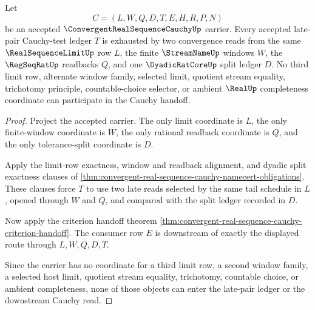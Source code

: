 \begin{theorem}\label{thm:convergent-real-sequence-cauchy-late-pair-exhaustion}
Let
$$
C=(L,W,Q,D,T,E,H,R,P,N)
$$
be an accepted $\ConvergentRealSequenceCauchyUp$ carrier. Every accepted late-pair Cauchy-test ledger $T$ is exhausted by two convergence reads from the same $\RealSequenceLimitUp$ row $L$, the finite $\StreamNameUp$ windows $W$, the $\RegSeqRatUp$ readbacks $Q$, and one $\DyadicRatCoreUp$ split ledger $D$. No third limit row, alternate window family, selected limit, quotient stream equality, trichotomy principle, countable-choice selector, or ambient $\RealUp$ completeness coordinate can participate in the Cauchy handoff.
\end{theorem}
\begin{proof}
Project the accepted carrier. The only limit coordinate is $L$, the only finite-window coordinate is $W$, the only rational readback coordinate is $Q$, and the only tolerance-split coordinate is $D$.

Apply the limit-row exactness, window and readback alignment, and dyadic split exactness clauses of \autoref{thm:convergent-real-sequence-cauchy-namecert-obligations}. These clauses force $T$ to use two late reads selected by the same tail schedule in $L$, opened through $W$ and $Q$, and compared with the split ledger recorded in $D$.

Now apply the criterion handoff theorem \autoref{thm:convergent-real-sequence-cauchy-criterion-handoff}. The consumer row $E$ is downstream of exactly the displayed route through $L,W,Q,D,T$.

Since the carrier has no coordinate for a third limit row, a second window family, a selected host limit, quotient stream equality, trichotomy, countable choice, or ambient completeness, none of those objects can enter the late-pair ledger or the downstream Cauchy read.
\end{proof}



